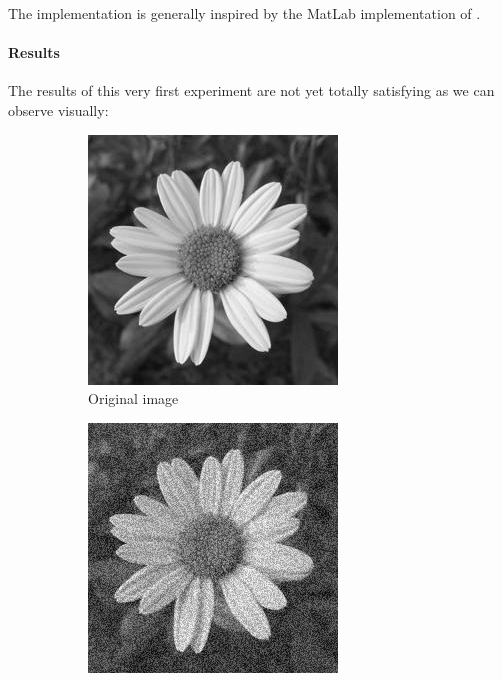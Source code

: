 The implementation is generally inspired by the MatLab implementation of \cite{glide_2014}.

\paragraph{Results}
The results of this very first experiment are not yet totally satisfying as we can observe visually:

\begin{figure}[H]
    \centering
    \begin{subfigure}[b]{0.32\textwidth}
        \includegraphics[width=\textwidth]{img/flowerOriginal.png}
        \caption{Original image}
    \end{subfigure}
    \begin{subfigure}[b]{0.32\textwidth}
        \includegraphics[width=\textwidth]{img/flowerNoisy.png}

\end{subfigure}
\end{figure}
